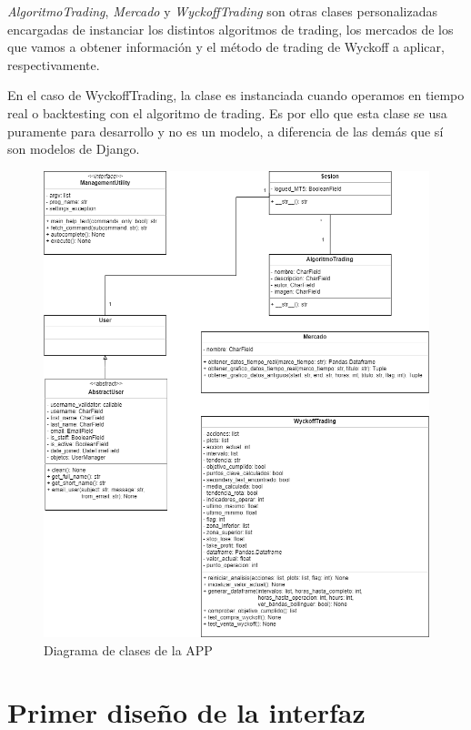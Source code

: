 \textit{AlgoritmoTrading}, \textit{Mercado} y \textit{WyckoffTrading} son otras clases personalizadas encargadas de instanciar los distintos algoritmos de trading, los mercados de los que vamos a obtener información y el método de trading de Wyckoff a aplicar, respectivamente. \newline

En el caso de WyckoffTrading, la clase es instanciada cuando operamos en tiempo real o backtesting con el algoritmo de trading. Es por ello que esta clase se usa puramente para desarrollo y no es un modelo, a diferencia de las demás que sí son modelos de Django.\newline

\begin{figure}[h]
	\includegraphics[width=1.2\textwidth]{imagenes/diagrama_clases.png}
	\caption{Diagrama de clases de la APP} \label{diagrama_clases}
\end{figure}

\section{Primer diseño de la interfaz}

